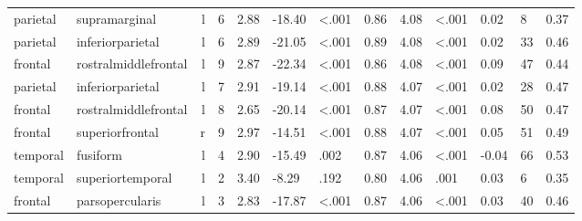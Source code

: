 \documentclass{article}
\begin{document}
\begin{longtable}{llrR{1.3cm}R{1cm}R{1.3cm}R{1cm}R{1cm}R{1.3cm}R{1cm}R{1.8cm}R{1.3cm}R{1.8cm}}
  parietal &             supramarginal &    l &         6 &                  2.88 &           -18.40 &      \textless.001 &                               0.86 &                          4.08 &                   \textless.001 &   0.02 &      8 &      0.37 \\
  parietal &          inferiorparietal &    l &         6 &                  2.89 &           -21.05 &      \textless.001 &                               0.89 &                          4.08 &                   \textless.001 &   0.02 &     33 &      0.46 \\
   frontal &      rostralmiddlefrontal &    l &         9 &                  2.87 &           -22.34 &      \textless.001 &                               0.86 &                          4.08 &                   \textless.001 &   0.09 &     47 &      0.44 \\
  parietal &          inferiorparietal &    l &         7 &                  2.91 &           -19.14 &      \textless.001 &                               0.88 &                          4.07 &                   \textless.001 &   0.02 &     28 &      0.47 \\
   frontal &      rostralmiddlefrontal &    l &         8 &                  2.65 &           -20.14 &      \textless.001 &                               0.87 &                          4.07 &                   \textless.001 &   0.08 &     50 &      0.47 \\
   frontal &           superiorfrontal &    r &         9 &                  2.97 &           -14.51 &      \textless.001 &                               0.88 &                          4.07 &                   \textless.001 &   0.05 &     51 &      0.49 \\
  temporal &                  fusiform &    l &         4 &                  2.90 &           -15.49 &               .002 &                               0.87 &                          4.06 &                   \textless.001 &  -0.04 &     66 &      0.53 \\
  temporal &          superiortemporal &    l &         2 &                  3.40 &            -8.29 &               .192 &                               0.80 &                          4.06 &                            .001 &   0.03 &      6 &      0.35 \\
   frontal &           parsopercularis &    l &         3 &                  2.83 &           -17.87 &      \textless.001 &                               0.87 &                          4.06 &                   \textless.001 &   0.03 &     40 &      0.46 \\

\end{longtable}
\end{document}
